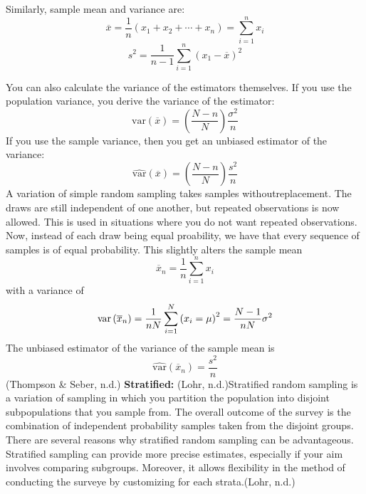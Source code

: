 \documentclass[12pt,twoside]{reedthesis}
\begin{document}
Similarly, sample mean and variance are:
\[
\overline{x} = \frac{1}{n} \left(x_1 + x_2 + \cdots + x_n \right) = \sum_{i=1}^{n}x_i 
\]
\[
s^2 = \frac{1}{n-1} \sum^n_{i=1} \left( x_1 - \overline{x} \right)^2
\]

You can also calculate the variance of the estimators themselves. If you use the population variance, you derive the variance of the estimator:
\[
\text{var}\left(\overline{x}\right) = \left(\frac{N-n}{N}\right)\frac{\sigma^2}{n} 
\]
If you use the sample variance, then you get an unbiased estimator of the variance:
\[
\widehat{\text{var}}\left(\overline{x}\right) = \left(\frac{N-n}{N}\right)\frac{s^2}{n}
\]
A variation of simple random sampling takes samples withoutreplacement. The draws are still independent of one another, but repeated observations is now allowed. This is used in situations where you do not want repeated observations. Now, instead of each draw being equal proability, we have that every sequence of samples is of equal probability. This slightly alters the sample mean
\[
\overline{x}_n = \frac{1}{n}\sum^n_{i=1}x_i
\]
with a variance of
\[
\text{var}\left(\overline{x}_n\right) = \frac{1}{n\space N} \sum_{i=1}^N\left(x_i = \mu\right)^2 = \frac{N-1}{n\space N}\sigma^2
\]
The unbiased estimator of the variance of the sample mean is
\[
\widehat{\text{var}} \left( \overline{x}_n \right) = \frac{s^2}{n}
\]
(Thompson \& Seber, n.d.)
\textbf{Stratified:}
(Lohr, n.d.)Stratified random sampling is a variation of sampling in which you partition the population into disjoint subpopulations that you sample from. The overall outcome of the survey is the combination of independent probability samples taken from the disjoint groups. There are several reasons why stratified random sampling can be advantageous. Stratified sampling can provide more precise estimates, especially if your aim involves comparing subgroups. Moreover, it allows flexibility in the method of conducting the surveye by customizing for each strata.(Lohr, n.d.)
\end{document}
